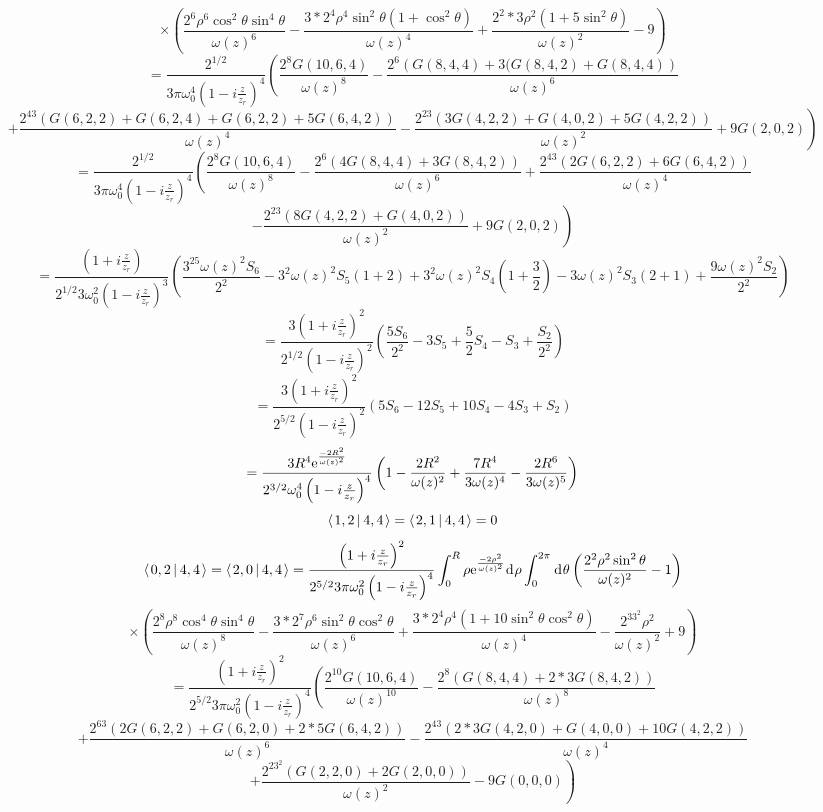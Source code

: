 \documentclass[11pt]{amsart}
\makeatletter
\newcommand{\e}{{\rm e}}				%
\newcommand{\msp}[1]{\mspace{#1mu}}		%
\newcommand{\0}{\varnothing}		%
\newcommand{\dd}{\msp{1} {\rm{d}} \msp{1}}	%
\newcommand{\brac}[2]{\left\langle\msp{2} #1\left\lvert \msp{3.5} #2 \right.\right\rangle}	%
\newcommand{\1}{!}
\newcommand{\2}{@}
\newcommand{\3}{\#}
\newcommand{\4}{\$}
\newcommand{\5}{\%}
\newcommand{\6}{$^\wedge$}
\newcommand{\7}{\&}
\newcommand{\8}{*}
\newcommand{\9}{(}
\makeatother
\begin{document}
\[
\times\left(\frac{2^6\rho^6\cos^2\theta\sin^4\theta}{\omega(z)^6}-\frac{3*2^4\rho^4\sin^2\theta\left(1+\cos^2\theta\right)}{\omega(z)^4}+\frac{2^2*3\rho^2\left(1+5\sin^2\theta\right)}{\omega(z)^2}-9\right)
\]
\[
=\frac{2^{1/2}}{3\pi \omega_0^4\left(1-i\frac{z}{z_r}\right)^4}\left(\frac{2^8G(10,6,4)}{\omega(z)^8}-\frac{2^6\left(G(8,4,4)+3(G(8,4,2)+G(8,4,4)\right)}{\omega(z)^6}\right.
\]
\[
\left.+\frac{2^43\left(G(6,2,2)+G(6,2,4)+G(6,2,2)+5G(6,4,2)\right)}{\omega(z)^4}-\frac{2^23\left(3G(4,2,2)+G(4,0,2)+5G(4,2,2)\right)}{\omega(z)^2}+9G(2,0,2)\right)
\]
\[
=\frac{2^{1/2}}{3\pi \omega_0^4\left(1-i\frac{z}{z_r}\right)^4}\left(\frac{2^8G(10,6,4)}{\omega(z)^8}-\frac{2^6\left(4G(8,4,4)+3G(8,4,2)\right)}{\omega(z)^6}+\frac{2^43\left(2G(6,2,2)+6G(6,4,2)\right)}{\omega(z)^4}\right.
\]
\[
\left.-\frac{2^23\left(8G(4,2,2)+G(4,0,2)\right)}{\omega(z)^2}+9G(2,0,2)\right)
\]
\[
=\frac{\left(1+i\frac{z}{z_r}\right)}{2^{1/2}3\omega_0^2\left(1-i\frac{z}{z_r}\right)^3}\left(\frac{3^25\omega(z)^2S_6}{2^2}-3^2\omega(z)^2S_5\left(1+2\right)+3^2\omega(z)^2S_4\left(1+\frac{3}{2}\right)-3\omega(z)^2S_3\left(2+1\right)+\frac{9\omega(z)^2S_2}{2^2}\right)
\]
\[
=\frac{3\left(1+i\frac{z}{z_r}\right)^2}{2^{1/2}\left(1-i\frac{z}{z_r}\right)^2}\left(\frac{5S_6}{2^2}-3S_5+\frac{5}{2}S_4-S_3+\frac{S_2}{2^2}\right)
\]
\[
=\frac{3\left(1+i\frac{z}{z_r}\right)^2}{2^{5/2}\left(1-i\frac{z}{z_r}\right)^2}\left(5S_6-12S_5+10S_4-4S_3+S_2\right)
\]
\[
=\frac{3R^4\e^{\frac{-2R^2}{\omega(z)^2}}}{2^{3/2}\omega_0^4\left(1-i\frac{z}{z_r}\right)^4}\left(1-\frac{2R^2}{\omega(z)^2}+\frac{7R^4}{3\omega(z)^4}-\frac{2R^6}{3\omega(z)^5}\right)
\]
\[
\brac{1,2}{4,4} = \brac{2,1}{4,4} = 0
\]
\[
\brac{0,2}{4,4} = \brac{2,0}{4,4} = \frac{\left(1+i\frac{z}{z_r}\right)^2}{2^{5/2}3\pi\omega_0^2\left(1-i\frac{z}{z_r}\right)^4}\int_0^R\rho \e^{\frac{-2\rho^2}{\omega(z)^2}}\dd \rho \int_0^{2\pi}\dd \theta \left(\frac{2^2\rho^2\sin^2\theta}{\omega(z)^2}-1\right)
\]
\[
\times\left(\frac{2^8\rho^8\cos^4\theta\sin^4\theta}{\omega(z)^8}-\frac{3*2^7\rho^6\sin^2\theta\cos^2\theta}{\omega(z)^6}+\frac{3*2^4\rho^4\left(1+10\sin^2\theta\cos^2\theta\right)}{\omega(z)^4}-\frac{2^33^2\rho^2}{\omega(z)^2}+9\right)
\]
\[
=\frac{\left(1+i\frac{z}{z_r}\right)^2}{2^{5/2}3\pi\omega_0^2\left(1-i\frac{z}{z_r}\right)^4}\left(\frac{2^{10}G(10,6,4)}{\omega(z)^{10}}-\frac{2^8\left(G(8,4,4)+2*3G(8,4,2)\right)}{\omega(z)^8}
\right.
\]
\[
\left.+\frac{2^63\left(2G(6,2,2)+G(6,2,0)+2*5G(6,4,2)\right)}{\omega(z)^6}-\frac{2^43\left(2*3G(4,2,0)+G(4,0,0)+10G(4,2,2)\right)}{\omega(z)^4}
\right.
\]
\[
\left. +\frac{2^23^2\left(G(2,2,0)+2G(2,0,0)\right)}{\omega(z)^2}-9G(0,0,0)\right)
\]
\end{document}
